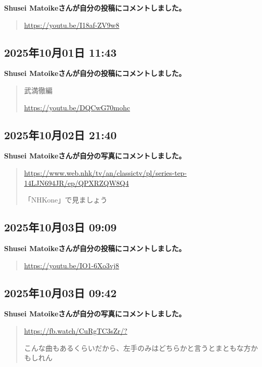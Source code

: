 \textbf{Shusei Matoikeさんが自分の投稿にコメントしました。}

\begin{quote}
\url{https://youtu.be/I18af-ZV9w8}
\end{quote}

\subsection*{2025年10月01日 11:43}

\textbf{Shusei Matoikeさんが自分の投稿にコメントしました。}

\begin{quote}
武満徹編

\url{https://youtu.be/DQCwG70mohc}
\end{quote}

\subsection*{2025年10月02日 21:40}

\textbf{Shusei Matoikeさんが自分の写真にコメントしました。}

\begin{quote}
\url{https://www.web.nhk/tv/an/classictv/pl/series-tep-14LJN694JR/ep/QPXRZQW8Q4}

「NHKone」で見ましょう
\end{quote}

\subsection*{2025年10月03日 09:09}

\textbf{Shusei Matoikeさんが自分の投稿にコメントしました。}

\begin{quote}
\url{https://youtu.be/IO1-6Xo3vj8}
\end{quote}

\subsection*{2025年10月03日 09:42}

\textbf{Shusei Matoikeさんが自分の写真にコメントしました。}

\begin{quote}
\url{https://fb.watch/CuRgTC3sZr/?}

こんな曲もあるくらいだから、左手のみはどちらかと言うとまともな方かもしれん
\end{quote}

